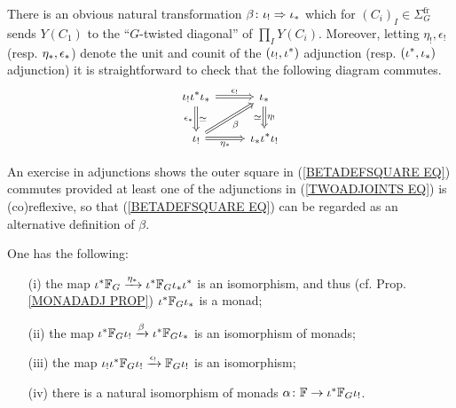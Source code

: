 \documentclass[a4paper,10pt]{article}%
\begin{document}
There is an obvious natural transformation $\beta \colon \iota_! \Rightarrow \iota_{\**}$ which for 
$(C_i)_I \in \Sigma_G^{\text{fr}}$
sends $Y(C_1)$ to the ``$G$-twisted diagonal'' of 
$\prod_I Y(C_i)$.
Moreover, letting $\eta_!,\epsilon_!$ 
(resp. $\eta_{\**},\epsilon_{\**}$)
denote the unit and counit of the $(\iota_!,\iota^{\**})$ adjunction 
(resp. $(\iota^{\**},\iota_{\**})$ adjunction)
it is straightforward to check that the following diagram commutes.
\begin{equation}\label{BETADEFSQUARE EQ}
\begin{tikzcd}
		\iota_{!} \iota^{\**} \iota_{\**}
		\ar[Rightarrow]{r}{\epsilon_!}
		\ar[Rightarrow]{d}{\simeq}[swap]{\epsilon_{\**}}
	&
		\iota_{\**}
		\ar[Rightarrow]{d}{\eta_{!}}[swap]{\simeq}
\\
		\iota_!
		\ar[Rightarrow]{r}[swap]{\eta_{\**}}
		\ar[Rightarrow]{ru}[swap]{\beta}
	&
		\iota_{\**} \iota^{\**} \iota_{!}
\end{tikzcd}
\end{equation}
\begin{remark} An exercise in adjunctions shows the outer square in (\ref{BETADEFSQUARE EQ})
 commutes provided at least one of the adjunctions in (\ref{TWOADJOINTS EQ}) is (co)reflexive, so that (\ref{BETADEFSQUARE EQ}) can be regarded as an alternative definition of $\beta$.
\end{remark}


\begin{proposition}
        \label{MONAD_COMPARISON_PROP}
	One has the following:
\begin{itemize}
	\item[(i)]
	the map 
	$\iota^{\**} \mathbb{F}_G
		\xrightarrow{\eta_{\**}}
	\iota^{\**} \mathbb{F}_G \iota_{\**} \iota^{\**}$
	is an isomorphism, 
	and thus (cf. Prop. \ref{MONADADJ PROP})
	$\iota^{\**} \mathbb{F}_G \iota_{\**}$
	is a monad;
	\item[(ii)] the map 
	$\iota^{\**} \mathbb{F}_G \iota_{!}
	\xrightarrow{\beta}	
	\iota^{\**} \mathbb{F}_G \iota_{\**}$ is an isomorphism of monads;
	\item[(iii)] the map 
	$\iota_{!}\iota^{\**} \mathbb{F}_G \iota_{!}
	\xrightarrow{\epsilon_!}
	\mathbb{F}_G \iota_{!}$ is an isomorphism;
	\item[(iv)] there is a natural isomorphism of monads
	$\alpha \colon \mathbb{F} \to \iota^{\**} \mathbb{F}_G \iota_{!}$.
\end{itemize}
\end{proposition}
\end{document}
